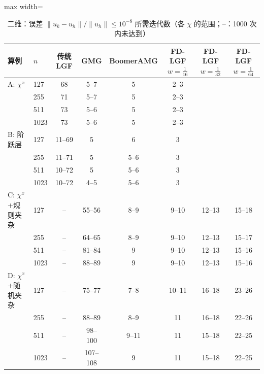\begin{table}[H]\centering\small
\caption{二维：误差 $\|u_k-u_h\|/\|u_h\|\le10^{-8}$ 所需迭代数（各 $\chi$ 的范围；--：1000 次内未达到）}\label{tab:k82d}
\begin{adjustbox}{max width=\textwidth}
\begin{tabular}{llcccccc}
\toprule
算例 & $n$ & 传统 LGF & GMG & BoomerAMG & FD-LGF $w{=}\frac1{16}$ & FD-LGF $w{=}\frac1{32}$ & FD-LGF $w{=}\frac1{64}$ \\
\midrule
A: $\chi^x$ & 127 & 68 & 5--7 & 5 & 2--3 &  &  \\
 & 255 & 71 & 5--7 & 5 & 2--3 &  &  \\
 & 511 & 73 & 5--6 & 5 & 2--3 &  &  \\
 & 1023 & 73 & 5--6 & 5 & 2--3 &  &  \\
\midrule
B: 阶跃层 & 127 & 11--69 & 5 & 6 & 3 &  &  \\
 & 255 & 11--71 & 5 & 5--6 & 3 &  &  \\
 & 511 & 10--72 & 5 & 5--6 & 3 &  &  \\
 & 1023 & 10--72 & 4--5 & 5--6 & 3 &  &  \\
\midrule
C: $\chi^x$+规则夹杂 & 127 & -- & 55--56 & 8--9 & 9--10 & 12--13 & 15--18 \\
 & 255 & -- & 64--65 & 8--9 & 9--10 & 12--13 & 15--17 \\
 & 511 & -- & 81--84 & 9 & 9--10 & 12--13 & 15--16 \\
 & 1023 & -- & 88--89 & 9 & 9--10 & 12--13 & 15--16 \\
\midrule
D: $\chi^x$+随机夹杂 & 127 & -- & 75--77 & 7--8 & 10--11 & 16--18 & 23--26 \\
 & 255 & -- & 88--89 & 8--9 & 11 & 16--18 & 22--26 \\
 & 511 & -- & 98--100 & 9--11 & 11 & 15--18 & 22--25 \\
 & 1023 & -- & 107--108 & 9 & 11 & 15--18 & 22--25 \\
\bottomrule
\end{tabular}
\end{adjustbox}
\end{table}

